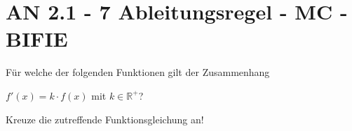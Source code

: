 \section{AN 2.1 - 7 Ableitungsregel - MC - BIFIE}

\begin{beispiel}[AN 2.1]{1} %
				Für welche der folgenden Funktionen gilt der Zusammenhang 

$f'(x)=k\cdot f(x)$ mit $k\in\mathbb{R^+}$?
\leer

Kreuze die zutreffende Funktionsgleichung an!
\end{beispiel}